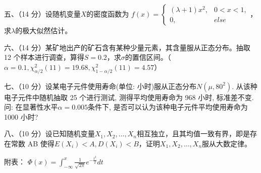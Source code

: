\documentclass[fontset=exam]{exam-zh}
\begin{document}

五、（14 分）设随机变量\(X\)的密度函数为 \(f(x)=\begin{cases}(\lambda+1)x^2,&0<x<1,\\0,&else\end{cases}\)，求\(\lambda\)的极大似然估计。


六、（14 分）某矿地出产的矿石含有某种少量元素，其含量服从正态分布。抽取 12 个样本进行调查，算得\(S=0.2\)，求\(\sigma\)的置信区间。（\(\alpha=0.1,\chi^2_{\alpha/2}(11)=19.68,\chi^2_{1-\alpha/2}(11)=4.57\)）


七、（10 分）设某电子元件使用寿命(单位: 小时)服从正态分布\(N(\mu,80^2)\). 从该种电子元件中随机抽取 25 个进行测试, 测得平均使用寿命为 968 小时, 标准差不变. 问: 在显著性水平\(\alpha=0.005\)条件下, 是否可以认为该种电子元件平均使用寿命为 1000 小时?


八、（10 分）设已知随机变量\(X_1,X_2,\ldots,X_n\)相互独立，且其均值一致有界，即是存在常数 AB 使得\(E(X_i)<A,D(X_i)<B\)，证明\(X_1,X_2,\ldots,X_n\)服从大数定律。

附表： \(\Phi(x) = {\int_{- \infty}^{x}{\frac{1}{\sqrt{2\pi}}e^{- \frac{t^{2}}{2}}dt}}\)
\end{document}
